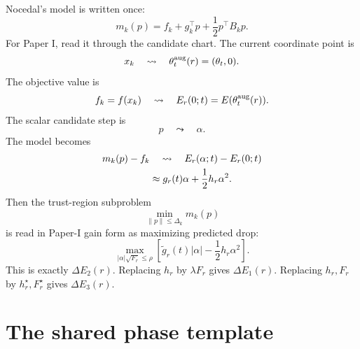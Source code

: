 \documentclass[10pt,twocolumn]{article}
\begin{document}
Nocedal's model is written once:
\begin{equation}
m_k(p)=f_k+g_k^\top p+\frac12p^\top B_kp.
\label{eq:appendix_nocedal_once}
\end{equation}
For Paper I, read it through the candidate chart. The current coordinate point is
\begin{equation}
x_k
\quad\leadsto\quad
\theta_t^{\rm aug}(r)=(\theta_t,0).
\label{eq:line_xk}
\end{equation}
The objective value is
\begin{equation}
f_k=f(x_k)
\quad\leadsto\quad
E_r(0;t)=E(\theta_t^{\rm aug}(r)).
\label{eq:line_fk}
\end{equation}
The scalar candidate step is
\begin{equation}
p
\quad\leadsto\quad
\alpha.
\label{eq:line_p_alpha}
\end{equation}
The model becomes
\begin{align}
m_k(p)-f_k
&\quad\leadsto\quad
E_r(\alpha;t)-E_r(0;t)
\notag\\
&\approx
g_r(t)\alpha+\frac12h_r\alpha^2.
\label{eq:line_scalar_model}
\end{align}
Then the trust-region subproblem
\begin{equation}
\min_{\|p\|\le\Delta_k}m_k(p)
\label{eq:nocedal_subproblem_again}
\end{equation}
is read in Paper-I gain form as maximizing predicted drop:
\begin{equation}
\max_{|\alpha|\sqrt{F_r}\le\rho}
\left[
\widetilde g_r(t)|\alpha|-\frac12h_r\alpha^2
\right].
\label{eq:line_gain_form}
\end{equation}
This is exactly \(\Delta E_2(r)\). Replacing \(h_r\) by \(\lambda F_r\) gives \(\Delta E_1(r)\). Replacing \(h_r,F_r\) by \(h_r^\star,F_r^\star\) gives \(\Delta E_3(r)\).

\section{The shared phase template}
\end{document}
